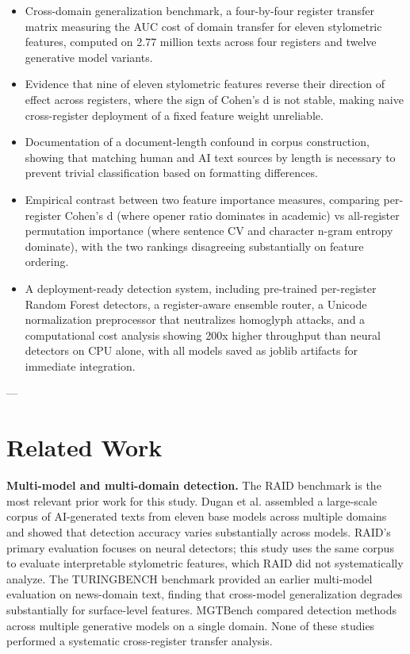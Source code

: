 \documentclass{article}
\begin{document}
\begin{itemize}
  \item Cross-domain generalization benchmark, a four-by-four register transfer matrix measuring the AUC cost of domain transfer for eleven stylometric features, computed on 2.77 million texts across four registers and twelve generative model variants.
  \item Evidence that nine of eleven stylometric features reverse their direction of effect across registers, where the sign of Cohen's d is not stable, making naive cross-register deployment of a fixed feature weight unreliable.
  \item Documentation of a document-length confound in corpus construction, showing that matching human and AI text sources by length is necessary to prevent trivial classification based on formatting differences.
  \item Empirical contrast between two feature importance measures, comparing per-register Cohen's d (where opener ratio dominates in academic) vs all-register permutation importance (where sentence CV and character n-gram entropy dominate), with the two rankings disagreeing substantially on feature ordering.
  \item A deployment-ready detection system, including pre-trained per-register Random Forest detectors, a register-aware ensemble router, a Unicode normalization preprocessor that neutralizes homoglyph attacks, and a computational cost analysis showing 200x higher throughput than neural detectors on CPU alone, with all models saved as joblib artifacts for immediate integration.
\end{itemize}

---

\section{Related Work}

\textbf{Multi-model and multi-domain detection.} The RAID benchmark \cite{ref4} is the most relevant prior work for this study. Dugan et al. assembled a large-scale corpus of AI-generated texts from eleven base models across multiple domains and showed that detection accuracy varies substantially across models. RAID's primary evaluation focuses on neural detectors; this study uses the same corpus to evaluate interpretable stylometric features, which RAID did not systematically analyze. The TURINGBENCH benchmark \cite{ref5} provided an earlier multi-model evaluation on news-domain text, finding that cross-model generalization degrades substantially for surface-level features. MGTBench \cite{ref6} compared detection methods across multiple generative models on a single domain. None of these studies performed a systematic cross-register transfer analysis.
\end{document}
